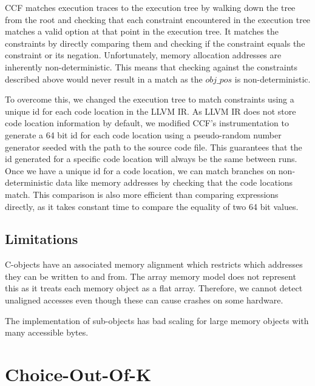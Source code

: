 \documentclass[12pt,twoside]{report}
\begin{document}
CCF matches execution traces to the execution tree by walking down the tree from the root and checking that each constraint encountered in the execution tree matches a valid option at that point in the execution tree. It matches the constraints by directly comparing them and checking if the constraint equals the constraint or its negation. Unfortunately, memory allocation addresses are inherently non-deterministic. This means that checking against the constraints described above would never result in a match as the $obj\_pos$ is non-deterministic.

To overcome this, we changed the execution tree to match constraints using a unique id for each code location in the LLVM IR. As LLVM IR does not store code location information by default, we modified CCF's instrumentation to generate a 64 bit id for each code location using a pseudo-random number generator seeded with the path to the source code file. This guarantees that the id generated for a specific code location will always be the same between runs. Once we have a unique id for a code location, we can match branches on non-deterministic data like memory addresses by checking that the code locations match. This comparison is also more efficient than comparing expressions directly, as it takes constant time to compare the equality of two 64 bit values.

\subsection{Limitations}
C-objects have an associated memory alignment which restricts which addresses they can be written to and from. The array memory model does not represent this as it treats each memory object as a flat array. Therefore, we cannot detect unaligned accesses even though these can cause crashes on some hardware.

The implementation of sub-objects has bad scaling for large memory objects with many accessible bytes.



\section{Choice-Out-Of-K}
\end{document}
